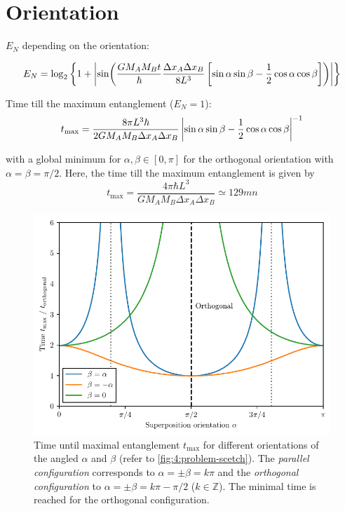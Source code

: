 \section{Orientation}
$E_N$ depending on the orientation:

\begin{equation}
  E_N = \log_2\left\{
    1 + \left\lvert
      \sin(
      \frac{G M_A M_B t}{\hbar} \frac{\Delta x_A \Delta x_B}{8L^3}
      \left[ \sin\alpha\sin\beta - \frac{1}{2}\cos\alpha\cos\beta \right]
      )
      \right\rvert
  \right\}
\end{equation}

Time till the maximum entanglement ($E_N = 1$):
\begin{equation}\label{eq:4:t-max}
  t_\mathrm{max} = \frac{8 \pi L^3 \hbar}{2 G M_A M_B \Delta x_A\Delta x_B} \left\lvert\sin\alpha\sin\beta - \frac{1}{2}\cos\alpha\cos\beta\right\rvert^{-1}
\end{equation}

with a global minimum for $\alpha,\beta \in [0, \pi]$ for the orthogonal orientation with $\alpha = \beta = \pi/2$. Here, the time till the maximum entanglement is given by
\begin{equation}
  t_\mathrm{max} = \frac{4 \pi \hbar L^3}{G M_A M_B \Delta x_A \Delta x_B} \simeq 129\si{mn}
\end{equation}

\begin{figure}[!htbp]
  \centering
  \includegraphics[width=\textwidth]{./../figures/ideal-entanglement/EN-orientation.pdf}
  \caption{Time until maximal entanglement $t_\mathrm{max}$ for different orientations of the angled $\alpha$ and $\beta$ (refer to \cref{fig:4:problem-scetch}). The \textit{parallel configuration} corresponds to $\alpha = \pm\beta = k\pi$ and the \textit{orthogonal configuration} to $\alpha = \pm\beta = k\pi - \pi/2$ ($k \in \mathbb{Z}$). The minimal time is reached for the orthogonal configuration.}
  \label{fig:4:tmax-orientation}
\end{figure}

